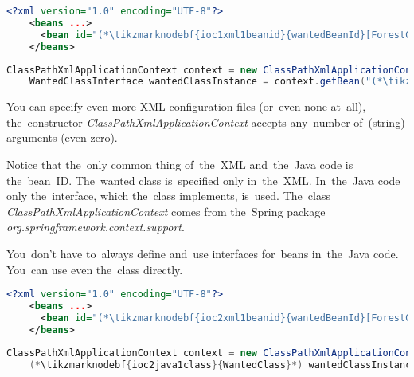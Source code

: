\example
\begin{lstlisting}[language=XML, title={Configuration XML}]
    <?xml version="1.0" encoding="UTF-8"?>
    <beans ...>
      <bean id="(*\tikzmarknodebf{ioc1xml1beanid}{wantedBeanId}[ForestGreen]*)" class="package.subfolder.WantedClass"/>
    </beans>
\end{lstlisting}
\begin{lstlisting}[language=Java, title={Usage}]
    ClassPathXmlApplicationContext context = new ClassPathXmlApplicationContext("configurationFile.xml");
    WantedClassInterface wantedClassInstance = context.getBean("(*\tikzmarknodebf{ioc1java1beanid}{wantedBeanId}[ForestGreen]*)", WantedClassInterface.class);
\end{lstlisting}

\noindent You can specify even more XML configuration files (or~even none at~all), the~constructor \textit{ClassPathXmlApplicationContext} accepts any~number of~(string) arguments (even zero).

Notice that the~only common thing of~the~XML and~the~Java code is the~bean~ID. The~wanted class is~specified only in~the~XML. In~the~Java code only the~interface, which the~class implements, is~used. The~class \textit{ClassPathXmlApplicationContext} comes from the~Spring package \textit{org.springframework.context.support}.

\note You~don't have to~always define and~use interfaces for~beans in~the~Java code. You~can use even the~class directly.
\begin{lstlisting}[language=XML, title={Configuration XML}]
    <?xml version="1.0" encoding="UTF-8"?>
    <beans ...>
      <bean id="(*\tikzmarknodebf{ioc2xml1beanid}{wantedBeanId}[ForestGreen]*)" class="package.subfolder.(*\tikzmarknodebf{ioc2xml1class}{WantedClass}[ForestGreen]*)"/>
    </beans>
\end{lstlisting}
\begin{lstlisting}[language=Java, title={Usage}]
    ClassPathXmlApplicationContext context = new ClassPathXmlApplicationContext("configurationFile.xml");
    (*\tikzmarknodebf{ioc2java1class}{WantedClass}*) wantedClassInstance = context.getBean("(*\tikzmarknodebf{ioc2java1beanid}{wantedBeanId}[ForestGreen]*)", (*\tikzmarknodebf{ioc2java1class2}{WantedClass}*).class);
\end{lstlisting}

